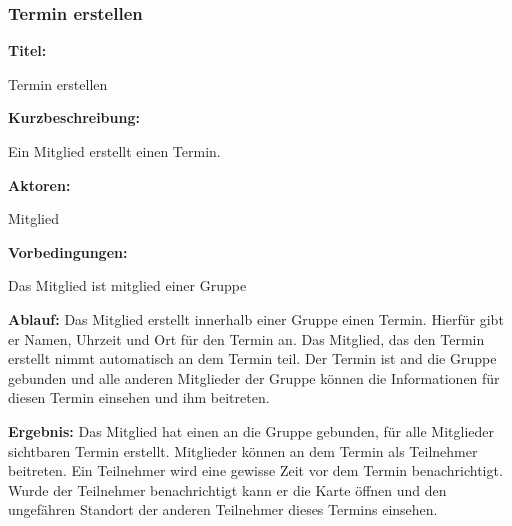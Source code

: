 \documentclass{scrartcl}
\begin{document}
	\subsubsection{Termin erstellen}
	\begin{description}
		\item \textbf{Titel:}
		\begin{description}
			\item Termin erstellen
		\end{description}
		\item \textbf{Kurzbeschreibung:}
		\begin{description}
			\item Ein Mitglied erstellt einen Termin.
		\end{description}
		\item \textbf{Aktoren:}
		\begin{description}
			\item Mitglied
		\end{description}
		\item \textbf{Vorbedingungen:}
		\begin{description}
			\item Das Mitglied ist mitglied einer Gruppe
		\end{description}
		\item \textbf{Ablauf:} \newline Das Mitglied erstellt innerhalb einer Gruppe einen Termin. Hierfür gibt er Namen, Uhrzeit und Ort für den Termin an. Das Mitglied, das den Termin erstellt nimmt automatisch an dem Termin teil. Der Termin ist and die Gruppe gebunden und alle anderen Mitglieder der Gruppe können die Informationen für diesen Termin einsehen und ihm beitreten.
		\item \textbf{Ergebnis:} \newline Das Mitglied hat einen an die Gruppe gebunden, für alle Mitglieder sichtbaren Termin erstellt. Mitglieder können an dem Termin als Teilnehmer beitreten. Ein Teilnehmer wird eine gewisse Zeit vor dem Termin benachrichtigt. Wurde der Teilnehmer benachrichtigt kann er die Karte öffnen und den ungefähren Standort der anderen Teilnehmer dieses Termins einsehen.
	\end{description}
	
	\newpage
	
\end{document}
